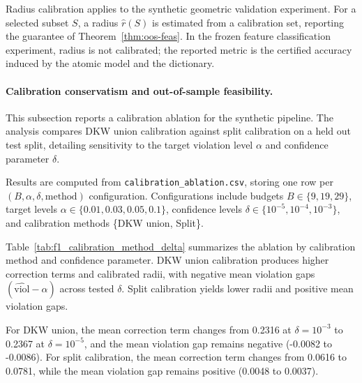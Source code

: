 \documentclass[accepted]{uai2026}
\theoremstyle{plain}
\theoremstyle{definition}
\theoremstyle{remark}
\begin{document}
Radius calibration applies to the synthetic geometric validation experiment. For a selected subset $S$, a radius $\widehat r(S)$ is estimated from a calibration set, reporting the guarantee of Theorem~\ref{thm:oos-feas}. In the frozen feature classification experiment, radius is not calibrated; the reported metric is the certified accuracy induced by the atomic model and the dictionary.

\paragraph{Calibration conservatism and out-of-sample feasibility.}
This subsection reports a calibration ablation for the synthetic pipeline. The analysis compares DKW union calibration against split calibration on a held out test split, detailing sensitivity to the target violation level $\alpha$ and confidence parameter $\delta$.

Results are computed from \texttt{calibration\_ablation.csv}, storing one row per $(B,\alpha,\delta,\text{method})$ configuration. Configurations include budgets $B \in \{9,19,29\}$, target levels $\alpha \in \{0.01,0.03,0.05,0.1\}$, confidence levels $\delta \in \{10^{-5},10^{-4},10^{-3}\}$, and calibration methods \{DKW union, Split\}.

Table~\ref{tab:f1_calibration_method_delta} summarizes the ablation by calibration method and confidence parameter. DKW union calibration produces higher correction terms and calibrated radii, with negative mean violation gaps $(\widehat{\mathrm{viol}}-\alpha)$ across tested $\delta$. Split calibration yields lower radii and positive mean violation gaps.

For DKW union, the mean correction term changes from 0.2316 at $\delta=10^{-3}$ to 0.2367 at $\delta=10^{-5}$, and the mean violation gap remains negative (-0.0082 to -0.0086). For split calibration, the mean correction term changes from 0.0616 to 0.0781, while the mean violation gap remains positive (0.0048 to 0.0037).
\end{document}
